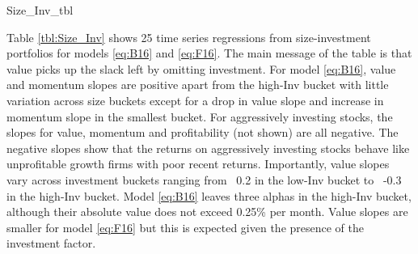 
{Size_Inv_tbl}

Table \ref{tbl:Size_Inv} shows 25 time series regressions from size-investment
portfolios for models \ref{eq:B16} and \ref{eq:F16}.
The main message of the table is that value picks up the slack left by
omitting investment.
For model \ref{eq:B16},
value and momentum slopes are positive apart from the high-Inv bucket
with little variation across size buckets except for a drop in value slope and
increase in momentum slope in the smallest bucket.
For aggressively investing stocks, the slopes for value, momentum and
profitability (not shown) are all negative.
The negative slopes show that the returns on aggressively investing stocks
behave like unprofitable growth firms with poor recent returns.
Importantly, value slopes vary across investment buckets ranging from ~0.2 in
the low-Inv bucket to ~-0.3 in the high-Inv bucket.
Model \ref{eq:B16} leaves three alphas in the high-Inv bucket,
although their absolute value does not exceed 0.25\% per month.
Value slopes are smaller for model \ref{eq:F16} but this is expected given the
presence of the investment factor.
